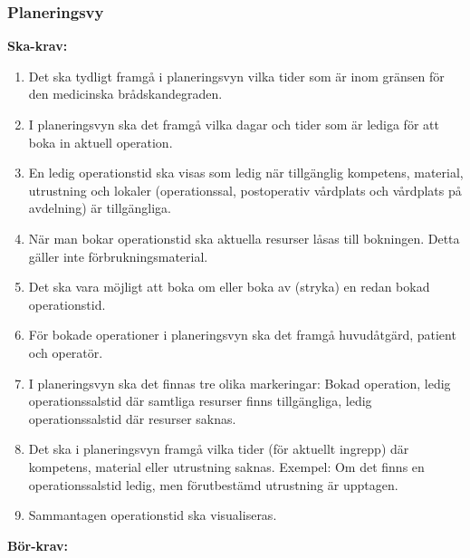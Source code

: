 \documentclass{article}
\begin{document}
\subsubsection{Planeringsvy}\label{subsubsec:Planeringsvy}
\textbf{Ska-krav: }
\begin{enumerate}
\item Det ska tydligt framgå i planeringsvyn vilka tider som är inom gränsen
för den medicinska brådskandegraden.
\item I planeringsvyn ska det framgå vilka dagar och tider som är lediga för
att boka in aktuell operation.
\item En ledig operationstid ska visas som ledig när tillgänglig kompetens,
material, utrustning och lokaler (operationssal, postoperativ vårdplats och
vårdplats på avdelning) är tillgängliga.
\item När man bokar operationstid ska aktuella resurser låsas till bokningen.
Detta gäller inte förbrukningsmaterial.
\item Det ska vara möjligt att boka om eller boka av (stryka) en redan bokad
operationstid.
\item För bokade operationer i planeringsvyn ska det framgå huvudåtgärd,
patient och operatör.
\item I planeringsvyn ska det finnas tre olika markeringar: Bokad operation,
ledig operationssalstid där samtliga resurser finns tillgängliga, ledig
operationssalstid där resurser saknas.
\item Det ska i planeringsvyn framgå vilka tider (för aktuellt ingrepp) där
kompetens, material eller utrustning saknas.
Exempel: Om det finns en operationssalstid ledig, men förutbestämd utrustning
är upptagen.
\item Sammantagen operationstid ska visualiseras.
\end{enumerate}
\textbf{Bör-krav: }
\end{document}
